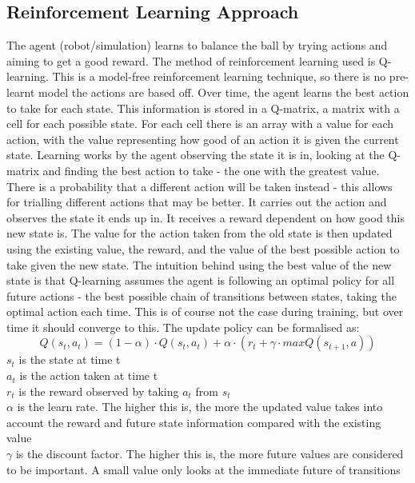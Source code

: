 \documentclass[12pt,a4paper]{article}
\begin{document}
\subsection{Reinforcement Learning Approach}
The agent (robot/simulation) learns to balance the ball by trying actions and aiming to get a good reward. The method of reinforcement learning used is Q-learning. This is a model-free reinforcement learning technique, so there is no pre-learnt model the actions are based off. Over time, the agent learns the best action to take for each state. This information is stored in a Q-matrix, a matrix with a cell for each possible state. For each cell there is an array with a value for each action, with the value representing how good of an action it is given the current state. Learning works by the agent observing the state it is in, looking at the Q-matrix and finding the best action to take - the one with the greatest value. There is a probability that a different action will be taken instead - this allows for trialling different actions that may be better. It carries out the action and observes the state it ends up in. It receives a reward dependent on how good this new state is. The value for the action taken from the old state is then updated using the existing value, the reward, and the value of the best possible action to take given the new state. The intuition behind using the best value of the new state is that Q-learning assumes the agent is following an optimal policy for all future actions - the best possible chain of transitions between states, taking the optimal action each time. This is of course not the case during training, but over time it should converge to this. The update policy can be formalised as:
\[Q(s_t, a_t) = (1 - \alpha) \cdot Q(s_t, a_t) + \alpha\cdot(r_t + \gamma\cdot max Q(s_{t+1}, a)) \]
$s_t$ is the state at time t \\
$a_t$ is the action taken at time t \\
$r_t$ is the reward observed by taking $a_t$ from $s_t$\\
$\alpha$ is the learn rate. The higher this is, the more the updated value takes into account the reward and future state information compared with the existing value\\
$\gamma$ is the discount factor. The higher this is, the more future values are considered to be important. A small value only looks at the immediate future of transitions\\
\end{document}
